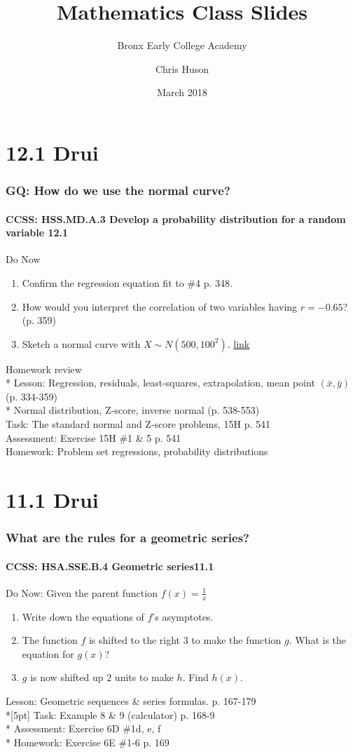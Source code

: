 \documentclass{beamer}
\title{Mathematics Class Slides}
\subtitle{Bronx Early College Academy}
\author{Chris Huson}
\date{March 2018}
\begin{document}
\frame{\titlepage}


\section{12.1 Drui}
\frame
{
  \frametitle{GQ: How do we use the normal curve?}
  \framesubtitle{CCSS: HSS.MD.A.3 Develop a probability distribution for a random variable \qquad \alert{12.1}}

  \begin{block}{Do Now}
    \begin{enumerate}
    \item Confirm the regression equation fit to \#4 p. 348.
    \item How would you interpret the correlation of two variables having $r=-0.65$? (p. 359)
    \item Sketch a normal curve with $X\sim N(500, 100^2)$.
    \href{https://blog.prepscholar.com/sat-standard-deviation}{link}
    \end{enumerate}
 \end{block}
  Homework review\\*
  Lesson:  Regression, residuals, least-squares, extrapolation, mean point $(\bar{x},\bar{y})$ (p. 334-359)\\* 
  Normal distribution, Z-score, inverse normal (p. 538-553) \\%
  Task: The standard normal and Z-score problems, 15H p. 541\\%
  Assessment: Exercise 15H \#1 \& 5 p. 541\\%
  Homework: Problem set regressions, probability distributions
}

\section{11.1 Drui}
\frame
{
  \frametitle{What are the rules for a geometric series?}
  \framesubtitle{CCSS: HSA.SSE.B.4 Geometric series\qquad \alert{11.1}}

  \begin{block}{Do Now: Given the parent function $f(x)=\frac{1}{x}$}
  \begin{enumerate}
      \item Write down the equations of $f$'s asymptotes.
      \item The function $f$ is shifted to the right 3 to make the function $g$. What is the equation for $g(x)$?
      \item $g$ is now shifted up 2 units to make $h$. Find $h(x)$.
  \end{enumerate}
  \end{block}
  Lesson: Geometric sequences \& series formulas. p. 167-179\\*[5pt]
  Task: Example 8 \& 9 (calculator) p. 168-9\\*
  Assessment: Exercise 6D \#1d, e, f\\*
  Homework: Exercise 6E \#1-6 p. 169
}
\end{document}
